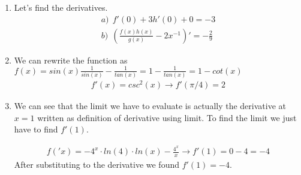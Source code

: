 \documentclass[13pt, a4paper, twoside]{article}
\begin{document}
\begin{enumerate}
    \item Let's find the derivatives.\\
    \begin{align*}
        a) \: \: f'(0) + 3h'(0) + 0 = -3\\
        b) \: \: (\frac{f(x)h(x)}{g(x)}-2x^{-1})' = -\frac{2}{9}
    \end{align*}
    \item We can rewrite the function as $f(x)=sin(x)\frac{1}{sin(x)} - \frac{1}{tan(x)}= 1-\frac{1}{tan(x)}=1-cot(x)$
    \begin{align*}
        f'(x) = csc^2(x) \to f'(\pi/4)= 2
    \end{align*}

    \item We can see that the limit we have to evaluate is actually the derivative at $x=1$
    written as definition of derivative using limit. To find the limit we just have to find $f'(1)$.

    \begin{align*}
        f('x) = -4^x\cdot ln(4) \cdot ln(x) - \frac{4^x}{x} \to f'(1) = 0 - 4 = -4
    \end{align*}
    After substituting to the derivative we found $f'(1)=-4$.
\end{enumerate}
\end{document}
